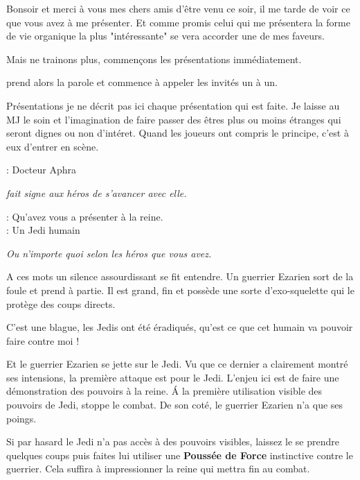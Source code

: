 \begin{quotebox}
Bonsoir et merci à vous mes chers amis d’être venu ce soir, il me tarde de voir ce que vous avez à me présenter. Et comme promis celui qui me présentera la forme de vie organique la plus "intéressante" se vera accorder une de mes faveurs.

Mais ne trainons plus, commençons les présentations immédiatement.
\end{quotebox}

 prend alors la parole et commence à appeler les invités un à un.

\begin{paperbox}{Présentations}
je ne décrit pas ici chaque présentation qui est faite. Je laisse au MJ le soin et l’imagination de faire passer des êtres plus ou moins étranges qui seront dignes ou non d’intéret. Quand les joueurs ont compris le principe, c’est à eux d’entrer en scène.
\end{paperbox}

\begin{quotebox}
\noindent\textbf{}: Docteur Aphra

\emph{ fait signe aux héros de s’avancer avec elle.}

\noindent\textbf{}: Qu’avez vous a présenter à la reine.\\
\noindent\textbf{}: Un Jedi humain

\emph{Ou n’importe quoi selon les héros que vous avez.}
\end{quotebox}

A ces mots un silence assourdissant se fit entendre. Un guerrier Ezarien sort de la foule et prend  à partie. Il est grand, fin et possède une sorte d’exo-squelette qui le protège des coups directs.

\begin{quotebox}
C’est une blague, les Jedis ont été éradiqués, qu’est ce que cet humain va pouvoir faire contre moi !
\end{quotebox}

Et le guerrier Ezarien se jette sur le Jedi. Vu que ce dernier a clairement montré ses intensions, la première attaque est pour le Jedi. L’enjeu ici est de faire une démonstration des pouvoirs à la reine. \'A la première utilisation visible des pouvoirs de Jedi,  stoppe le combat. De son coté, le guerrier Ezarien n’a que ses poings.

Si par hasard le Jedi n’a pas accès à des pouvoirs visibles, laissez le se prendre quelques coups puis faites lui utiliser une \textbf{Poussée de Force} instinctive contre le guerrier. Cela suffira à impressionner la reine qui mettra fin au combat.

